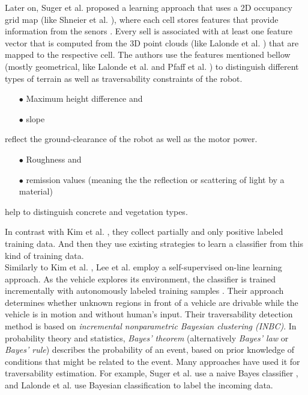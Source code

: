 \documentclass[12pt,a4paper]{report}
\newcommand{\etal}[1]{#1 et al.}
\newcommand{\term}{\textit}
\newcommand{\acronym}{\MakeUppercase}
\begin{document}
	Later on, \etal{Suger} proposed a learning approach that uses a \acronym{2d} 
	occupancy grid map (like \etal{Shneier} \cite{Shneier}), where each cell stores 
	features that provide information from the senors \cite{Suger}. Every sell is 
	associated with at least one feature vector that is computed from the \acronym{3d} 
	point clouds (like \etal{Lalonde} \cite{Lalonde}) that are mapped to the respective 
	cell. The authors use the features mentioned bellow (mostly geometrical, like \etal{Lalonde} and \etal{Pfaff} 
	\cite{Lalonde, Pfaff}) to distinguish different types of terrain as well as 
	traversability constraints of the robot. 
	\begin{enumerate}
		\item[$\bullet$] Maximum height difference and
		\item[$\bullet$] slope 
	\end{enumerate}
	reflect the ground-clearance of the robot as well as the motor power.
	\begin{enumerate}
		\item[$\bullet$] Roughness and
		\item[$\bullet$] remission values (meaning the the reflection or scattering 
		of light by a material) 
	\end{enumerate}
	help to distinguish concrete and vegetation types.
	\par
	In contrast with \etal{Kim} \cite{Kim}, they collect partially and only positive labeled 
	training data. And then they use existing strategies \cite{Denis, Elkan} to 
	learn a classifier from this kind of training data.
	\\
	
	Similarly to \etal{Kim} \cite{Kim}, \etal{Lee} employ a self-supervised on-line learning 
	approach. As the vehicle explores its environment, the classifier is trained 
	incrementally with autonomously labeled training samples \cite{Lee}. Their 
	approach determines whether unknown regions in front of a vehicle are drivable 
	while the vehicle is in motion and without human’s input. Their 
	traversability detection method is based on \term{incremental 
	nonparametric Bayesian clustering (\acronym{inbc})}. In probability theory and 
	statistics, \term{Bayes' theorem} (alternatively \term{Bayes' law} or \term{Bayes' rule}) describes 
	the probability of an event, based on prior knowledge of conditions that might 
	be related to the event. Many approaches have used it for traversability 
	estimation. For example, \etal{Suger} \cite{Suger} use a naive Bayes classifier \cite{Denis}, 
	and \etal{Lalonde} \cite{Lalonde} use Bayesian classification to label the incoming data.
	\\
	
\end{document}
